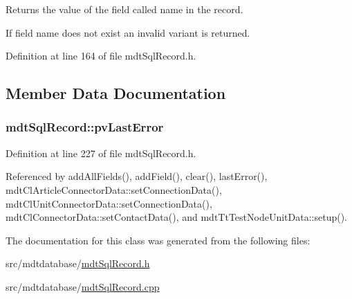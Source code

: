 Returns the value of the field called name in the record. 

If field name does not exist an invalid variant is returned. 

Definition at line 164 of file mdt\-Sql\-Record.\-h.



\subsection{Member Data Documentation}
\hypertarget{classmdt_sql_record_ae320a7933f4d5a002efc509c4c9c5a12}{
\subsubsection[{pv\-Last\-Error}]{ mdt\-Sql\-Record\-::pv\-Last\-Error\hspace{0.3cm}{\ttfamily [protected]}}}\label{classmdt_sql_record_ae320a7933f4d5a002efc509c4c9c5a12}


Definition at line 227 of file mdt\-Sql\-Record.\-h.



Referenced by add\-All\-Fields(), add\-Field(), clear(), last\-Error(), mdt\-Cl\-Article\-Connector\-Data\-::set\-Connection\-Data(), mdt\-Cl\-Unit\-Connector\-Data\-::set\-Connection\-Data(), mdt\-Cl\-Connector\-Data\-::set\-Contact\-Data(), and mdt\-Tt\-Test\-Node\-Unit\-Data\-::setup().



The documentation for this class was generated from the following files\-:\begin{DoxyCompactItemize}
\item 
src/mdtdatabase/\hyperlink{mdt_sql_record_8h}{mdt\-Sql\-Record.\-h}\item 
src/mdtdatabase/\hyperlink{mdt_sql_record_8cpp}{mdt\-Sql\-Record.\-cpp}\end{DoxyCompactItemize}
